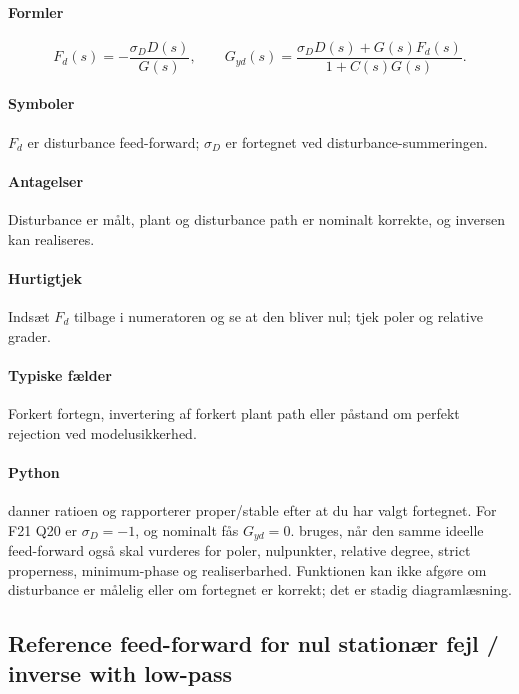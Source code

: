 \paragraph{Formler}
\begin{equation}
\label{eq:feedforward-cancellation}
F_d(s)=-\frac{\sigma_DD(s)}{G(s)},\qquad
G_{yd}(s)=\frac{\sigma_DD(s)+G(s)F_d(s)}{1+C(s)G(s)}.
\end{equation}

\paragraph{Symboler}
\(F_d\) er disturbance feed-forward; \(\sigma_D\) er fortegnet ved disturbance-summeringen.

\paragraph{Antagelser}
Disturbance er målt, plant og disturbance path er nominalt korrekte, og inversen kan
realiseres.

\paragraph{Hurtigtjek}
Indsæt \(F_d\) tilbage i numeratoren og se at den bliver nul; tjek poler og relative grader.

\paragraph{Typiske fælder}
Forkert fortegn, invertering af forkert plant path eller påstand om perfekt rejection ved
modelusikkerhed.

\paragraph{Python}
 danner ratioen og
rapporterer proper/stable efter at du har valgt fortegnet. For F21 Q20 er
\(\sigma_D=-1\), og nominalt fås \(G_{yd}=0\).
 bruges, når den samme ideelle
feed-forward også skal vurderes for poler, nulpunkter, relative degree, strict
properness, minimum-phase og realiserbarhed. Funktionen kan ikke afgøre om disturbance
er målelig eller om fortegnet er korrekt; det er stadig diagramlæsning.

\subsection{Reference feed-forward for nul stationær fejl / inverse with low-pass}
\label{sec:tracking-feedforward}

